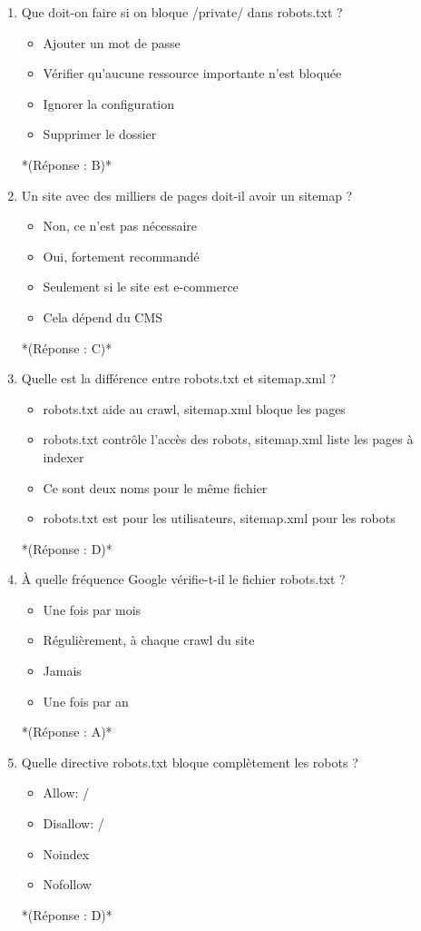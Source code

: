 \documentclass[12pt,a4paper,twoside]{report}
\begin{document}
\begin{enumerate}
\item Que doit-on faire si on bloque /private/ dans robots.txt ?
\begin{itemize}
\item[A)] Ajouter un mot de passe
\item[B)] Vérifier qu'aucune ressource importante n'est bloquée
\item[C)] Ignorer la configuration
\item[D)] Supprimer le dossier
\end{itemize}
*(Réponse : B)*

\item Un site avec des milliers de pages doit-il avoir un sitemap ?
\begin{itemize}
\item[A)] Non, ce n'est pas nécessaire
\item[B)] Oui, fortement recommandé
\item[C)] Seulement si le site est e-commerce
\item[D)] Cela dépend du CMS
\end{itemize}
*(Réponse : C)*

\item Quelle est la différence entre robots.txt et sitemap.xml ?
\begin{itemize}
\item[A)] robots.txt aide au crawl, sitemap.xml bloque les pages
\item[B)] robots.txt contrôle l'accès des robots, sitemap.xml liste les pages à indexer
\item[C)] Ce sont deux noms pour le même fichier
\item[D)] robots.txt est pour les utilisateurs, sitemap.xml pour les robots
\end{itemize}
*(Réponse : D)*

\item À quelle fréquence Google vérifie-t-il le fichier robots.txt ?
\begin{itemize}
\item[A)] Une fois par mois
\item[B)] Régulièrement, à chaque crawl du site
\item[C)] Jamais
\item[D)] Une fois par an
\end{itemize}
*(Réponse : A)*

\item Quelle directive robots.txt bloque complètement les robots ?
\begin{itemize}
\item[A)] Allow: /
\item[B)] Disallow: /
\item[C)] Noindex
\item[D)] Nofollow
\end{itemize}
*(Réponse : D)*


\end{enumerate}
\end{document}
